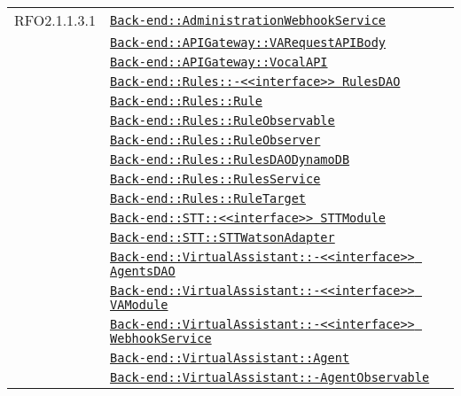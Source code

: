 \begin{longtable}{|>{\centering}m{3cm}|m{10cm}<{\centering}|}
RFO2.1.1.3.1 & \hyperref[Back-end::AdministrationWebhookService]{\texttt{Back-end::AdministrationWebhookService}}\\
& \hyperref[Back-end::APIGateway::VARequestAPIBody]{\texttt{Back-end::APIGateway::VARequestAPIBody}}\\
& \hyperref[Back-end::APIGateway::VocalAPI]{\texttt{Back-end::APIGateway::VocalAPI}}\\
& \hyperref[Back-end::Rules::<<interface>> RulesDAO]{\texttt{Back-end::Rules::-\linebreak <<interface>> RulesDAO}}\\
& \hyperref[Back-end::Rules::Rule]{\texttt{Back-end::Rules::Rule}}\\
& \hyperref[Back-end::Rules::RuleObservable]{\texttt{Back-end::Rules::RuleObservable}}\\
& \hyperref[Back-end::Rules::RuleObserver]{\texttt{Back-end::Rules::RuleObserver}}\\
& \hyperref[Back-end::Rules::RulesDAODynamoDB]{\texttt{Back-end::Rules::RulesDAODynamoDB}}\\
& \hyperref[Back-end::Rules::RulesService]{\texttt{Back-end::Rules::RulesService}}\\
& \hyperref[Back-end::Rules::RuleTarget]{\texttt{Back-end::Rules::RuleTarget}}\\
& \hyperref[Back-end::STT::<<interface>> STTModule]{\texttt{Back-end::STT::<<interface>> STTModule}}\\
& \hyperref[Back-end::STT::STTWatsonAdapter]{\texttt{Back-end::STT::STTWatsonAdapter}}\\
& \hyperref[Back-end::VirtualAssistant::<<interface>> AgentsDAO]{\texttt{Back-end::VirtualAssistant::-\linebreak <<interface>> AgentsDAO}}\\
& \hyperref[Back-end::VirtualAssistant::<<interface>> VAModule]{\texttt{Back-end::VirtualAssistant::-\linebreak <<interface>> VAModule}}\\
& \hyperref[Back-end::VirtualAssistant::<<interface>> WebhookService]{\texttt{Back-end::VirtualAssistant::-\linebreak <<interface>> WebhookService}}\\
& \hyperref[Back-end::VirtualAssistant::Agent]{\texttt{Back-end::VirtualAssistant::Agent}}\\
& \hyperref[Back-end::VirtualAssistant::AgentObservable]{\texttt{Back-end::VirtualAssistant::-\linebreak AgentObservable}}\\

\end{longtable}
